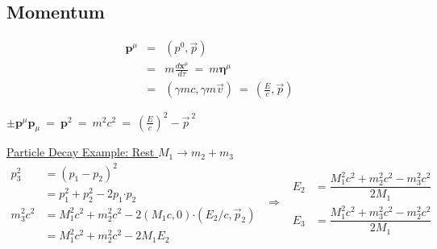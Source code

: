 \documentclass[12pt]{article}
\newcommand*{\dotP}{\boldsymbol \cdot}				%
\newcommand*{\contra}[1]{\boldsymbol {#1}^{\mu}}	%
\newcommand*{\covar}[1]{\boldsymbol {#1}_{\mu}}		%
\begin{document}
\subsection{Momentum}
\vspace{-5pt}
\begin{minipage}{0.45\textwidth}
	\begin{eqnarray*}
	\contra{p} &=& (p^0, \vec{p}) \\[5pt]
		&=& m\frac{d\contra{x}}{d\tau} \ =\  m \contra{\eta} \\[5pt]
		&=& \boxed{ (\gamma mc, \gamma m\vec{v}) \ =\  \left( \tfrac{E}{c}, \vec{p} \right) }
	\end{eqnarray*}
\end{minipage}
\hfill
\begin{minipage}{0.49\textwidth}
	\(\pm \contra{p}\covar{p} \ =\ \boxed{ {\boldsymbol{p}}^2 \ =\ m^2c^2 \ =\  \left( \tfrac{E}{c} \right)^2 - \vec{p}^{\ 2}}\)

	\vspace{20pt}
\end{minipage}

\vspace{20pt}
\indent \underline{Particle Decay Example: Rest \(M_1 \rightarrow m_2 + m_3\)}\\[10pt]
\indent \(\begin{aligned}
	p_3^2 &= (p_1 - p_2)^2 \\[5pt]
	&= p_1^2 + p_2^2 - 2 p_1 \dotP p_2\\[5pt]
	m_3^2c^2 &= M_1^2c^2 + m_2^2c^2 - 2 (M_1 c,0) \dotP (E_2/c,\vec{p}_2)\\[5pt]
	&= M_1^2c^2 + m_2^2c^2 - 2 M_1 E_2
\end{aligned} \ \ \Rightarrow \ \
\boxed{ \begin{aligned}
	E_2 &= \dfrac{M_1^2c^2 + m_2^2c^2 - m_3^2c^2 }{2M_1}\\[5pt]
	E_3 &= \dfrac{M_1^2c^2 + m_3^2c^2 - m_2^2c^2 }{2M_1}
\end{aligned} }\)

\end{document}
